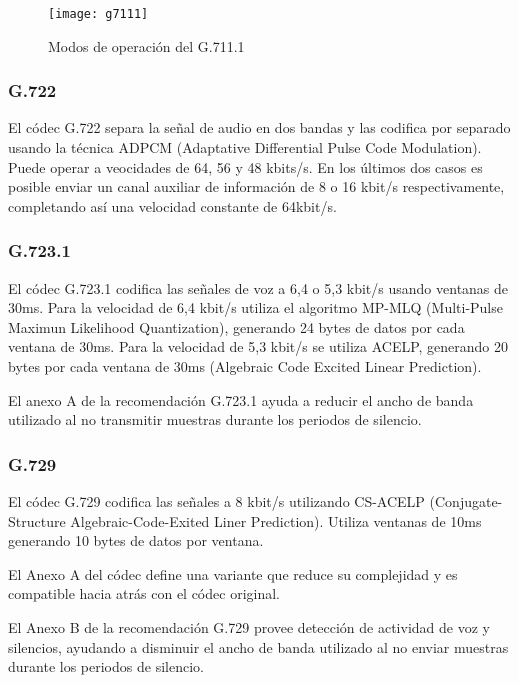 	\begin{figure}[h]
		\texttt{[image: g7111]}
		
		\caption{Modos de operación del G.711.1}
		
		\centering
		
		\label{fig:g7111}
	\end{figure}

\subsubsection{G.722}
El códec G.722 separa la señal de audio en dos bandas y las codifica por separado usando la técnica ADPCM (Adaptative Differential Pulse Code Modulation). Puede operar  a veocidades de 64, 56 y 48 kbits/s. En los últimos dos casos es posible enviar un canal auxiliar de información de 8 o 16 kbit/s respectivamente, completando así una velocidad constante de 64kbit/s.

\subsubsection{G.723.1}
El códec G.723.1 codifica las señales de voz a 6,4 o 5,3 kbit/s usando ventanas de 30ms. Para la velocidad de 6,4 kbit/s utiliza el algoritmo MP-MLQ (Multi-Pulse Maximun Likelihood Quantization), generando 24 bytes de datos por cada ventana de 30ms. Para la velocidad de 5,3 kbit/s se utiliza ACELP, generando 20 bytes por cada ventana de 30ms (Algebraic Code Excited Linear Prediction).

El anexo A de la recomendación G.723.1 ayuda a reducir el ancho de banda utilizado al no transmitir muestras durante los periodos de silencio.

\subsubsection{G.729}
El códec G.729 codifica las señales a 8 kbit/s utilizando CS-ACELP (Conjugate-Structure Algebraic-Code-Exited Liner Prediction). Utiliza ventanas de 10ms generando 10 bytes de datos por ventana.

El Anexo A del códec define una variante que reduce su complejidad y es compatible hacia atrás con el códec original.

El Anexo B de la recomendación G.729 provee detección de actividad de voz y silencios, ayudando a disminuir el ancho de banda utilizado al no enviar muestras durante los periodos de silencio.

